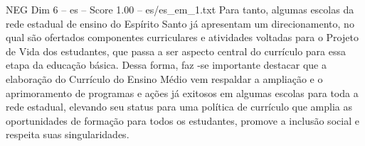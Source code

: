 \begin{textsample}{NEG Dim 6 – es – Score 1.00 – es/es\_em\_1.txt}
Para tanto, algumas escolas da rede estadual de ensino do Espírito Santo já apresentam um direcionamento, no qual são ofertados componentes curriculares e atividades voltadas para o Projeto de Vida dos estudantes, que passa a ser aspecto central do currículo para essa etapa da educação básica.
Dessa forma, faz -se importante destacar que a elaboração do Currículo do Ensino Médio vem respaldar a ampliação e o aprimoramento de programas e ações já exitosos em algumas escolas para toda a rede estadual, elevando seu status para uma política de currículo que amplia as oportunidades de formação para todos os estudantes, promove a inclusão social e respeita suas singularidades.

\end{textsample}
